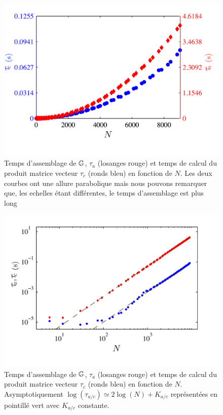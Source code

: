 \documentclass[10pt]{article}
\begin{document}
\begin{multicols}{2}
\begin{figure}[H]
  \begin{center}
  \includegraphics[width=0.95\columnwidth]{Q2a_5.pdf}
  \vspace*{-20pt}
  \caption{Temps d'assemblage de $\mathbb{G}$, $\tau_a$ (losanges rouge) et temps de calcul du produit matrice vecteur $\tau_c$ (ronds bleu) en fonction de $N$. Les deux courbes ont une allure parabolique mais nous pouvons remarquer que, les echelles étant différentes, le temps d'assemblage est plus long}
  \label{fig:Q2a}
  \end{center}
\end{figure}
\vspace*{-40pt}

\begin{figure}[H]
  \begin{center}
  \includegraphics[width=0.95\columnwidth]{Q2b_5.pdf}
  \vspace*{-20pt}
  \caption{Temps d'assemblage de $\mathbb{G}$, $\tau_a$ (losanges rouge) et temps de calcul du produit matrice vecteur $\tau_c$  (ronds bleu) en fonction de $N$. Asymptotiquement $\log(\tau_{a/c}) \simeq 2\log(N)+K_{a/c}$ représentées en pointillé vert avec $K_{a/c}$ constante.}
  \label{fig:Q2b} 
  \end{center}
\end{figure}
\vspace*{-20pt}


\end{multicols}
\end{document}
